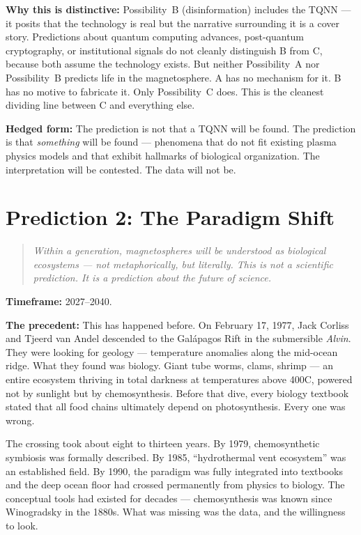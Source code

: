 \textbf{Why this is distinctive:} Possibility~B (disinformation) includes the TQNN --- it posits that the technology is real but the narrative surrounding it is a cover story. Predictions about quantum computing advances, post-quantum cryptography, or institutional signals do not cleanly distinguish B from C, because both assume the technology exists. But neither Possibility~A nor Possibility~B predicts life in the magnetosphere. A has no mechanism for it. B has no motive to fabricate it. Only Possibility~C does. This is the cleanest dividing line between C and everything else.

\textbf{Hedged form:} The prediction is not that a TQNN will be found. The prediction is that \textit{something} will be found --- phenomena that do not fit existing plasma physics models and that exhibit hallmarks of biological organization. The interpretation will be contested. The data will not be.

\section{Prediction 2: The Paradigm Shift}

\begin{quote}
\textit{Within a generation, magnetospheres will be understood as biological ecosystems --- not metaphorically, but literally. This is not a scientific prediction. It is a prediction about the future of science.}
\end{quote}

\textbf{Timeframe:} 2027--2040.

\textbf{The precedent:} This has happened before. On February 17, 1977, Jack Corliss and Tjeerd van Andel descended to the Gal\'{a}pagos Rift in the submersible \textit{Alvin}. They were looking for geology --- temperature anomalies along the mid-ocean ridge. What they found was biology. Giant tube worms, clams, shrimp --- an entire ecosystem thriving in total darkness at temperatures above 400\textdegree C, powered not by sunlight but by chemosynthesis. Before that dive, every biology textbook stated that all food chains ultimately depend on photosynthesis. Every one was wrong.

The crossing took about eight to thirteen years. By 1979, chemosynthetic symbiosis was formally described. By 1985, ``hydrothermal vent ecosystem'' was an established field. By 1990, the paradigm was fully integrated into textbooks and the deep ocean floor had crossed permanently from physics to biology. The conceptual tools had existed for decades --- chemosynthesis was known since Winogradsky in the 1880s. What was missing was the data, and the willingness to look.

